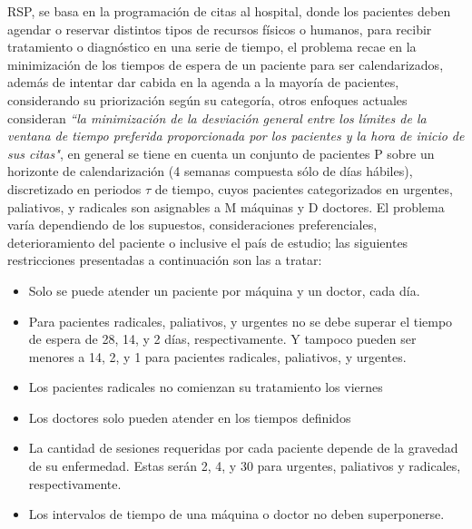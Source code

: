 \documentclass[letter, 10pt]{article}
\begin{document}
RSP, se basa en la programación de citas al hospital, donde los pacientes deben agendar o reservar distintos tipos de recursos físicos o humanos, para recibir tratamiento o diagnóstico en una serie de tiempo, el problema recae en la minimización de los tiempos de espera de un paciente para ser calendarizados\cite{siete}, además de intentar dar cabida en la agenda a la mayoría de pacientes, considerando su priorización según su categoría, otros enfoques actuales consideran \textit{``la minimización de la desviación general entre los límites de la ventana de tiempo preferida proporcionada por los pacientes y la hora de inicio de sus citas"}\cite{diez}, en general se tiene en cuenta un conjunto de pacientes P sobre un horizonte de calendarización (4 semanas compuesta sólo de días hábiles), discretizado en periodos $\tau$ de tiempo, cuyos pacientes categorizados en  urgentes, paliativos, y radicales son asignables a M máquinas y D doctores. El problema varía dependiendo de los supuestos, consideraciones preferenciales, deterioramiento  del paciente \cite{once} o inclusive el país de estudio; las siguientes restricciones presentadas a continuación son las a tratar:
\begin{itemize}
    \item Solo se puede atender un paciente por máquina y un doctor, cada día.
    \item Para pacientes radicales, paliativos, y urgentes no se debe superar el tiempo de espera de 28, 14, y 2 días, respectivamente. Y tampoco pueden ser menores a 14, 2, y 1 para pacientes radicales, paliativos, y urgentes.
    \item Los pacientes radicales no comienzan su tratamiento los viernes
    \item Los doctores solo pueden atender en los tiempos definidos
    \item La cantidad de sesiones requeridas por cada paciente depende de la gravedad de su
enfermedad. Estas serán 2, 4, y 30 para urgentes, paliativos y radicales, respectivamente.
    \item Los intervalos de tiempo de una máquina o doctor no deben superponerse.
    
\end{itemize}
\end{document}
